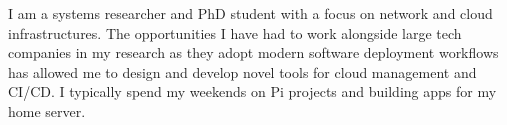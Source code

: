 \documentclass[9pt]{developercv} %
\begin{document}
\begin{minipage}[t]{0.35\textwidth} %
	\vspace{-\baselineskip} %

	I am a systems researcher and PhD student with a focus on network and cloud
	infrastructures. The opportunities I have had to work alongside large tech
	companies in my research as they adopt modern software deployment workflows
	has allowed me to design and develop novel tools for cloud management and
	CI/CD. I typically spend my weekends on Pi projects and building apps for my
	home server.\\
\end{minipage}
\hfill %
\begin{minipage}[t]{0.31\textwidth} %
	\vspace{-\baselineskip} %
	\begin{barchart}{4.1}
	\end{barchart}
\end{minipage}
\hfill %
\begin{minipage}[t]{0.29\textwidth} %
	\vspace{-\baselineskip}\vspace{-\baselineskip} %
	\\
	\mbox{}
	\mbox{}
	\mbox{}
	\mbox{}
	\mbox{}
\end{minipage}


\vspace{-1em}
\end{document}
